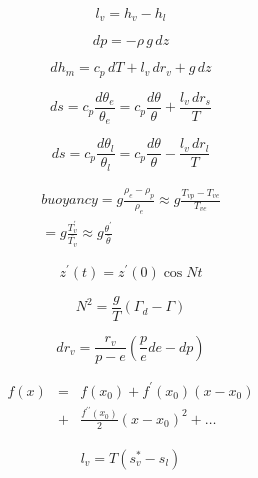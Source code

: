 \documentclass[12pt]{article}
\begin{document}
\begin{multicols}{2}
\begin{equation}
l_v = h_v - h_l
\end{equation}


\begin{equation}
dp = - \rho\,g\,dz
\end{equation}


\begin{equation}
\label{eq:moist}
  dh_m = c_p\,dT + l_v\,dr_v + g\,dz
\end{equation}

\begin{equation}
\label{eq:theta}
  ds = c_p \frac{d\theta_e}{\theta_e} = c_p \frac{d\theta}{\theta} + \frac{l_v\,dr_s}{T}
\end{equation}

\begin{equation}
  ds = c_p \frac{d\theta_l}{\theta_l} = c_p \frac{d\theta}{\theta} - \frac{l_v\,dr_l}{T}
\end{equation}

\begin{multline}
  buoyancy = g \frac{\rho_e - \rho_p}{\rho_e} \approx g \frac{T_{vp} - T_{ve}}{T_{ve}} \\
 = g \frac{T_v^\prime}{\overline{T_v}} \approx g \frac{\theta^\prime}{\overline{\theta}}
\end{multline}

\begin{equation}
  \label{eq:bv1}
  z^\prime(t) = z^\prime (0) \cos N t
\end{equation}

\begin{equation}
  \label{eq:bv2}
  N^2 = \frac{g}{T} ( \Gamma_d - \Gamma )
\end{equation}


\begin{equation}
  \label{eq:wdiff}
  d r_v = \frac{r_v}{p-e} \left ( \frac{p}{e} de - dp \right )
\end{equation}

\begin{eqnarray}
  \label{eq:taylor}
  f(x)  &=& f(x_0) + f^\prime(x_0)(x - x_0) \nonumber\\ 
        &+&  \frac{f^{\prime\prime}(x_0)}{2}(x-x_0)^2 +  \ldots
\end{eqnarray}

\begin{gather}
\label{eq:cc}
  l_v = T (s_v^* - s_l)
\end{gather}


\end{multicols}
\end{document}
